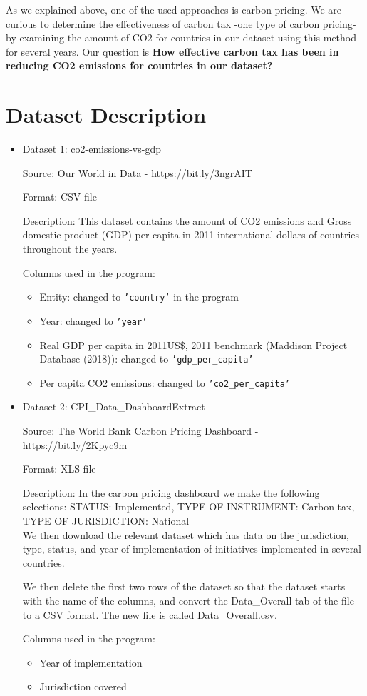 \documentclass[fontsize=11pt]{article}
\begin{document}
\noindent As we explained above, one of the used approaches is carbon pricing. We are curious to determine the effectiveness of carbon tax -one type of carbon pricing- by examining the amount of CO2 for countries in our dataset using this method for several years. Our question is \textbf{How effective carbon tax has been in reducing CO2 emissions for countries in our dataset? }


\section*{Dataset Description}


\begin{itemize}
\item Dataset 1: co2-emissions-vs-gdp

Source: Our World in Data - https://bit.ly/3ngrAIT

Format: CSV file

Description: This dataset contains the amount of CO2 emissions and Gross domestic product (GDP) per capita in 2011 international dollars of countries throughout the years.

Columns used in the program:
\begin{itemize}
\item Entity: changed to \texttt{'country'} in the program
\item Year: changed to \texttt{'year'}
\item Real GDP per capita in 2011US\$, 2011 benchmark (Maddison Project Database (2018)): changed to \texttt{'gdp\_per\_capita'}
\item Per capita CO2 emissions: changed to  \texttt{'co2\_per\_capita'}
\end{itemize}

\item Dataset 2:  CPI\_Data\_DashboardExtract

Source: The World Bank Carbon Pricing Dashboard - https://bit.ly/2Kpyc9m

Format: XLS file

Description: In the carbon pricing dashboard we make the following selections:
STATUS: Implemented,
TYPE OF INSTRUMENT: Carbon tax,
TYPE OF JURISDICTION: National \\
We then download the relevant dataset which has data on the jurisdiction, type, status, and year of implementation of initiatives implemented in several countries.

We then delete the first two rows of the dataset so that the dataset starts with the name of the columns, and convert the Data\_Overall tab of the file to a CSV format. The new file is called Data\_Overall.csv.

Columns used in the program:
\begin{itemize}
	\item Year of implementation
	\item Jurisdiction covered
\end{itemize}


\end{itemize}
\end{document}
